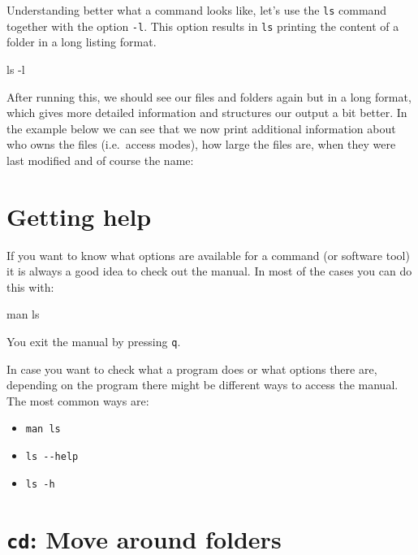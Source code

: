 \documentclass[
  letterpaper,
  DIV=11,
  numbers=noendperiod]{scrreprt}
\newenvironment{Shaded}{}{}
\newcommand{\AttributeTok}[1]{\textcolor[rgb]{0.84,0.23,0.29}{#1}}
\newcommand{\FunctionTok}[1]{\textcolor[rgb]{0.44,0.26,0.76}{#1}}
\newcommand{\NormalTok}[1]{\textcolor[rgb]{0.14,0.16,0.18}{#1}}
\providecommand{\tightlist}{%
  \setlength{\itemsep}{0pt}\setlength{\parskip}{0pt}}\usepackage{longtable,booktabs,array}
\begin{document}
Understanding better what a command looks like, let's use the
\texttt{ls} command together with the option \texttt{-l}. This option
results in \texttt{ls} printing the content of a folder in a long
listing format.

\begin{Shaded}
\begin{Highlighting}[]
\FunctionTok{ls} \AttributeTok{{-}l}
\end{Highlighting}
\end{Shaded}

After running this, we should see our files and folders again but in a
long format, which gives more detailed information and structures our
output a bit better. In the example below we can see that we now print
additional information about who owns the files (i.e.~access modes), how
large the files are, when they were last modified and of course the
name:

\section{Getting help}\label{getting-help}

If you want to know what options are available for a command (or
software tool) it is always a good idea to check out the manual. In most
of the cases you can do this with:

\begin{Shaded}
\begin{Highlighting}[]
\FunctionTok{man}\NormalTok{ ls}
\end{Highlighting}
\end{Shaded}

You exit the manual by pressing \texttt{q}.

In case you want to check what a program does or what options there are,
depending on the program there might be different ways to access the
manual. The most common ways are:

\begin{itemize}
\tightlist
\item
  \texttt{man\ ls}
\item
  \texttt{ls\ -\/-help}
\item
  \texttt{ls\ -h}
\end{itemize}

\section{\texorpdfstring{\texttt{cd}: Move around
folders}{cd: Move around folders}}\label{cd-move-around-folders}
\end{document}
